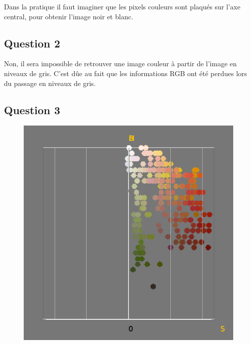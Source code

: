 \documentclass[a4paper,12pt]{report}
\begin{document}
Dans la pratique il faut imaginer que les pixels couleurs sont plaqués sur l'axe central, pour obtenir l'image noir et blanc.	

\subsection*{Question 2} 

Non, il sera impossible de retrouver une image couleur à partir de l'image en niveaux de gris. C'est dûe au fait que les informations RGB ont été perdues lors du passage en niveaux de gris.

\subsection*{Question 3}

\begin{figure}[!ht]
	\center
	\includegraphics[scale=0.4]{image/E2q2-1.png}	

\end{figure}
\end{document}
